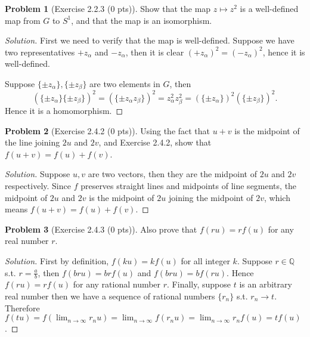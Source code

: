 \documentclass{article}
\theoremstyle{definition}
\newtheorem{problem}{Problem}
\theoremstyle{plain}
\begin{document}
\begin{problem}[Exercise 2.2.3 (0 pts)]Show that the map $z\mapsto z^2$ is a well-defined map from $G$ to $S^1$, and that the map is an isomorphism.
\end{problem}
\begin{adjustwidth}{0.7cm}{}
\color{blue}
\begin{proof}[Solution]First we need to verify that the map is well-defined. Suppose we have two representatives $+z_\alpha$ and $-z_\alpha$, then it is clear $(+z_\alpha)^2=(-z_\alpha)^2$, hence it is well-defined.\par
Suppose $\{\pm z_\alpha\},\{\pm z_\beta\}$ are two elements in $G$, then
\begin{displaymath}
(\{\pm z_\alpha\}\{\pm z_\beta\})^2=(\{\pm z_\alpha z_\beta\})^2=z_\alpha^2z_\beta^2=(\{\pm z_\alpha\})^2(\{\pm z_\beta\})^2.
\end{displaymath}
Hence it is a homomorphism.
\end{proof}
\color{black}
\end{adjustwidth}

\begin{problem}[Exercise 2.4.2 (0 pts)]Using the fact that $u+v$ is the midpoint of the line joining $2u$ and $2v$, and Exercise 2.4.2, show that $f(u+v)=f(u)+f(v)$.
\end{problem}
\begin{adjustwidth}{0.7cm}{}
\color{blue}
\begin{proof}[Solution]Suppose $u,v$ are two vectors, then they are the midpoint of $2u$ and $2v$ respectively. Since $f$ preserves straight lines and midpoints of line segments, the midpoint of $2u$ and $2v$ is the midpoint of $2u$ joining the midpoint of $2v$, which means $f(u+v)=f(u)+f(v)$.
\color{black}
\end{proof}
\end{adjustwidth}

\begin{problem}[Exercise 2.4.3 (0 pts)]Also prove that $f(ru)=rf(u)$ for any real number $r$.
\end{problem}
\begin{adjustwidth}{0.7cm}{}
\color{blue}
\begin{proof}[Solution]First by definition, $f(ku)=kf(u)$ for all integer $k$. Suppose $r\in\mathbb{Q}$ s.t. $r=\frac{a}{b}$, then $f(bru)=brf(u)$ and $f(bru)=bf(ru)$. Hence $f(ru)=rf(u)$ for any rational number $r$. Finally, suppose $t$ is an arbitrary real number then we have a sequence of rational numbers $\{r_n\}$ s.t. $r_n\to t$. Therefore $f(tu)=f(\lim_{n\to\infty}r_nu)=\lim_{n\to\infty}f(r_nu)=\lim_{n\to\infty}r_nf(u)=tf(u)$.
\color{black}
\end{proof}
\end{adjustwidth}
\end{document}
